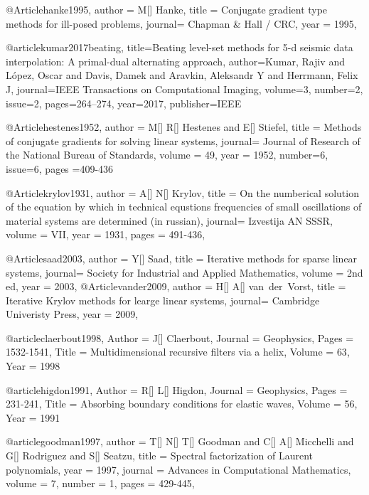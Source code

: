 @Article{hanke1995,
  author = 	 {M[] Hanke},
  title  = 	 {Conjugate gradient type methods for ill-posed problems},
  journal= 	 {Chapman \& Hall / CRC},
  year   = 	 1995,
}

@article{kumar2017beating,
  title={Beating level-set methods for 5-d seismic data interpolation: A primal-dual alternating approach},
  author={Kumar, Rajiv and L{\'o}pez, Oscar and Davis, Damek and Aravkin, Aleksandr Y and Herrmann, Felix J},
  journal={IEEE Transactions on Computational Imaging},
  volume={3},
  number={2},
  issue=2,
  pages={264--274},
  year={2017},
  publisher={IEEE}
}


@Article{hestenes1952,
  author = 	 {M[] R[] Hestenes and E[] Stiefel},
  title  = 	 {Methods of conjugate gradients for solving linear systems},
  journal= 	 {Journal of Research of the National Bureau of Standards},
  volume =	 {49},
  year   = 	 1952,
  number=6,
  issue=6,
  pages ={409-436}
}

@Article{krylov1931,
  author = 	 {A[] N[] Krylov},
  title  = 	 {On the numberical solution of the equation by which in technical equstions frequencies of small oscillations of material systems are determined (in russian)},
  journal= 	 {Izvestija AN SSSR},
  volume =	 {VII},
  year   = 	 1931,
  pages = 491-436,
}

@Article{saad2003,
  author = 	 {Y[] Saad},
  title  = 	 {Iterative methods for sparse linear systems},
  journal= 	 {Society for Industrial and Applied Mathematics},
  volume =	 {2nd ed},
  year   = 	 2003,
}
@Article{vander2009,
  author = 	 {H[] A[] van~der~Vorst},
  title  = 	 {Iterative Krylov methods for learge linear systems},
  journal= 	 {Cambridge Univeristy Press},
  year   = 	 2009,
}


@article{claerbout1998,
	Author = {J[] Claerbout},
	Journal = {Geophysics},
	Pages = {1532-1541},
	Title = {Multidimensional recursive filters via a helix},
	Volume = {63},
	Year = {1998}}

@article{higdon1991,
	Author = {R[] L[] Higdon},
	Journal = {Geophysics},
	Pages = {231-241},
	Title = {Absorbing boundary conditions for elastic waves},
	Volume = {56},
	Year = {1991}}
	



@article{goodman1997,
  author =	 {T[] N[] T[] Goodman and C[] A[] Micchelli and G[] Rodriguez and S[] Seatzu},
  title =	 {Spectral factorization of Laurent polynomials},
  year =	 1997,
  journal =	 {Advances in Computational Mathematics},
  volume =	 7,
  number =	 1,
  pages =	 {429-445},
}

